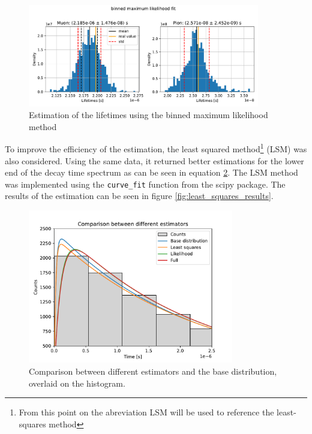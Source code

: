 \documentclass[11pt, a4paper, oneside]{book}
\newcommand\Plotwidth{0.8}
\newcommand\DoublePlotwidth{0.9}
\begin{document}
\begin{figure}[H]
    \centering
    \includegraphics[width=\DoublePlotwidth\textwidth]{images/estimators_hist_likelihood.pdf}
    \caption{Estimation of the lifetimes using the binned maximum likelihood method}
    \label{fig:likelihood_results}
\end{figure}

To improve the efficiency of the estimation, the least squared method\footnote{From this point on the abreviation LSM will be used to reference the least-squares method} (LSM) was also considered. Using the same data, it returned better estimations for the lower end of the decay time spectrum as can be seen in equation \ref{fig:comparison_estimators}. The LSM method was implemented using the \lstinline|curve_fit| function from the scipy package. The results of the estimation can be seen in figure \ref{fig:least_squares_results}.

\begin{figure}[H]
    \centering
    \includegraphics[width=\Plotwidth\textwidth]{images/comparison_estimators.pdf}
    \caption{Comparison between different estimators and the base distribution, overlaid on the histogram.}
    \label{fig:comparison_estimators}
\end{figure}
\end{document}
